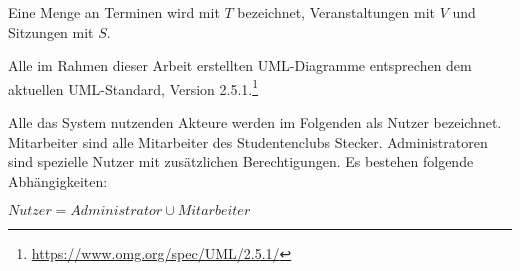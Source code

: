 Eine Menge an Terminen wird mit $T$ bezeichnet, Veranstaltungen mit $V$ und Sitzungen mit $S$.

Alle im Rahmen dieser Arbeit erstellten UML-Diagramme entsprechen dem aktuellen UML-Standard, Version 2.5.1.\footnote{\url{https://www.omg.org/spec/UML/2.5.1/}}

Alle das System nutzenden Akteure werden im Folgenden als Nutzer bezeichnet. Mitarbeiter sind alle Mitarbeiter des Studentenclubs Stecker. Administratoren sind spezielle Nutzer mit zusätzlichen Berechtigungen.
Es bestehen folgende Abhängigkeiten: 

$Nutzer = Administrator \cup Mitarbeiter$ 

